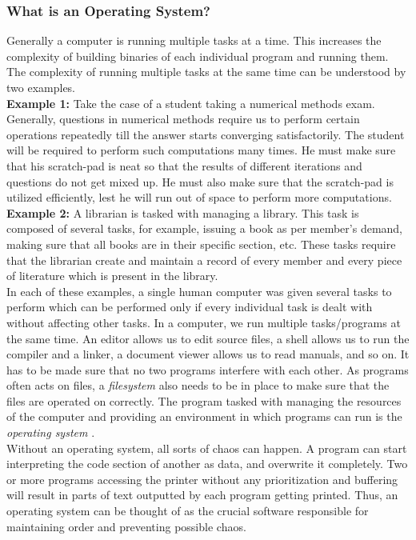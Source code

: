 \subsubsection{What is an Operating System?}
Generally a computer is running multiple tasks at a time. This increases the complexity of building binaries of each individual program and running them. The complexity of running multiple tasks at the same time can be understood by two examples.\\
\textbf{Example 1:} Take the case of a student taking a numerical methods exam. Generally, questions in numerical methods require us to perform certain operations repeatedly till the answer starts converging satisfactorily. The student will be required to perform such computations many times. He must make sure that his scratch-pad is neat so that the results of different iterations and questions do not get mixed up. He must also make sure that the scratch-pad is utilized efficiently, lest he will run out of space to perform more computations.\\
\textbf{Example 2:} A librarian is tasked with managing a library. This task is composed of several tasks, for example, issuing a book as per member's demand, making sure that all books are in their specific section, etc. These tasks require that the librarian create and maintain a record of every member and every piece of literature which is present in the library.\\
In each of these examples, a single human computer was given several tasks to perform which can be performed only if every individual task is dealt with without affecting other tasks. In a computer, we run multiple tasks/programs at the same time. An editor allows us to edit source files, a shell allows us to run the compiler and a linker, a document viewer allows us to read manuals, and so on. It has to be made sure that no two programs interfere with each other. As programs often acts on files, a \textit{filesystem} also needs to be in place to make sure that the files are operated on correctly. The program tasked with managing the resources of the computer and providing an environment in which programs can run is the \textit{operating system} \cite{tannenbaum2003operating}.\\
Without an operating system, all sorts of chaos can happen. A program can start interpreting the code section of another as data, and overwrite it completely. Two or more programs accessing the printer without any prioritization and buffering will result in parts of text outputted by each program getting printed. Thus, an operating system can be thought of as the crucial software responsible for maintaining order and preventing possible chaos.


